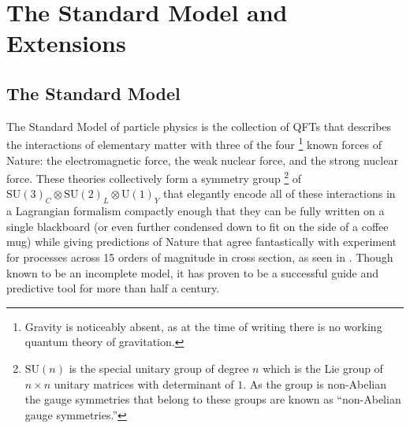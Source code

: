 \chapter{The Standard Model and Extensions}\label{chapter:theory}

\section{The Standard Model}\label{section:standard_model}

The Standard Model of particle physics is the collection of \glspl{QFT} that describes the interactions of elementary matter with three of the four%
\footnote{Gravity is noticeably absent, as at the time of writing there is no working quantum theory of gravitation.}
known forces of Nature: the electromagnetic force, the weak nuclear force, and the strong nuclear force.
These theories collectively form a symmetry group%
\footnote{$\mathrm{SU}(n)$ is the special unitary group of degree $n$ which is the Lie group  of $n\times n$ unitary matrices with determinant of $1$.
 As the group is non-Abelian the gauge symmetries that belong to these groups are known as ``non-Abelian gauge symmetries.''}
of $\mathrm{SU}(3)_{C} \otimes \mathrm{SU}(2)_{L} \otimes \mathrm{U}(1)_{Y}$ that elegantly encode all of these interactions in a Lagrangian formalism compactly enough that they can be fully written on a single blackboard (or even further condensed down to fit on the side of a coffee mug) while giving predictions of Nature that agree fantastically with experiment for processes across 15 orders of magnitude in cross section, as seen in .
Though known to be an incomplete model, it has proven to be a successful guide and predictive tool for more than half a century.

